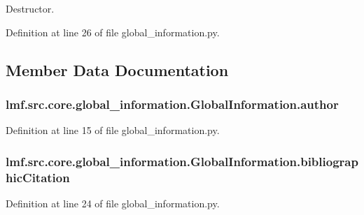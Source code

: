Destructor. 



Definition at line 26 of file global\+\_\+information.\+py.



\subsection{Member Data Documentation}
\hypertarget{classlmf_1_1src_1_1core_1_1global__information_1_1_global_information_a96ffe5559235b6b6c681b45a61d697af}{
\subsubsection[{author}]{\setlength{\rightskip}{0pt plus 5cm}lmf.\+src.\+core.\+global\+\_\+information.\+Global\+Information.\+author}}\label{classlmf_1_1src_1_1core_1_1global__information_1_1_global_information_a96ffe5559235b6b6c681b45a61d697af}


Definition at line 15 of file global\+\_\+information.\+py.

\hypertarget{classlmf_1_1src_1_1core_1_1global__information_1_1_global_information_a02d9de85d8225dc1411986b763df19ab}{
\subsubsection[{bibliographic\+Citation}]{\setlength{\rightskip}{0pt plus 5cm}lmf.\+src.\+core.\+global\+\_\+information.\+Global\+Information.\+bibliographic\+Citation}}\label{classlmf_1_1src_1_1core_1_1global__information_1_1_global_information_a02d9de85d8225dc1411986b763df19ab}


Definition at line 24 of file global\+\_\+information.\+py.

